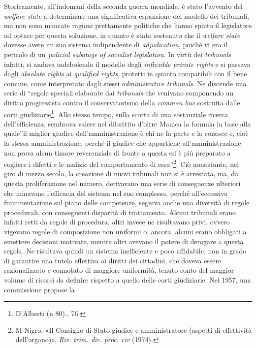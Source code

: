 \documentclass[12pt,it,a4paper,]{report}
\begin{document}
Storicamente, all'indomani della seconda guerra mondiale, è stato
l'avvento del \emph{welfare state} a determinare una significativa
espansione del modello dei tribunali, ma non sono mancate ragioni
prettamente politiche che hanno spinto il legislatore ad optare per
questa soluzione, in quanto è stato sostenuto che il \emph{welfare
state} dovesse avere un suo sistema indipendente di \emph{adjudication},
poiché vi era il pericolo di un \emph{judicial sabotage of socialist
legislation}. In virtù dei \emph{tribunals} infatti, si andava
indebolendo il modello degli \emph{inflexible private rights} e si
passava dagli \emph{absolute rights} ai \emph{qualified rights},
protetti in quanto compatibili con il bene comune, come interpretato
dagli stessi \emph{administrative tribunals}. Ne discende una serie di
``regole speciali elaborate dai \emph{tribunals} che venivano componendo
un diritto progressista contro il conservatorismo della \emph{common
law} costruita dalle corti giudiziarie\footnote{{D'Alberti (n 80).}, 76.}.
Allo stesso tempo, sulla scorta di una sostanziale ricerca
dell'efficienza, sembrava valere nel dibattito d'oltre Manica la formula
in base alla quale''il miglior giudice dell'amministrazione è chi ne fa
parte e la conosce e, cioè la stessa amministrazione, perché il giudice
che appartiene all'amministrazione non prova alcun timore reverenziale
di fronte a questa ed è più preparato a cogliere i difetti e le malizie
del comportamento di essa''\footnote{{M Nigro, {«Il Consiglio di Stato
  giudice e amministratore (aspetti di effettività dell'organo)»},
  \emph{Riv. trim. dir. proc. civ} (1974).}}. Ciò nonostante, nel giro
di mezzo secolo, la creazione di nuovi tribunali non si è arrestata, ma,
da questa proliferazione nel numero, derivavano una serie di conseguenze
ulteriori che minavano l'efficacia del sistema nel suo complesso, perché
all'eccessiva frammentazione sul piano delle competenze, seguiva anche
una diversità di regole procedurali, con conseguenti disparità di
trattamento. Alcuni tribunali erano infatti retti da regole di
procedura, altri invece ne risultavano privi, ovvero vigevano regole di
composizione non uniformi o, ancora, alcuni erano obbligati a emettere
decisioni motivate, mentre altri avevano il potere di derogare a questa
regola. Ne risultava quindi un sistema inefficiente e poco affidabile,
non in grado di garantire una tutela effettiva ai diritti dei cittadini,
che doveva essere razionalizzato e connotato di maggiore uniformità,
tenuto conto del maggior volume di ricorsi da definire rispetto a quello
delle corti giudiziarie. Nel 1957, una commissione propose la
\end{document}
